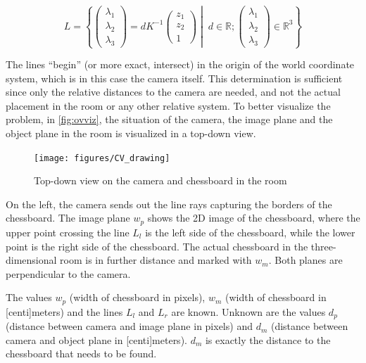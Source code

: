 \begin{equation} \label{eq:line}
    L = \left\{ \begin{pmatrix} \lambda_1 \\ \lambda_2 \\ \lambda_3 \end{pmatrix} = d K^{-1} \begin{pmatrix} z_1 \\ z_2 \\ 1 \end{pmatrix} \middle\vert \; d \in \mathbb{R}; \begin{pmatrix} \lambda_1 \\ \lambda_2 \\ \lambda_3 \end{pmatrix} \in \mathbb{R}^3 \right\}
\end{equation}

The lines \enquote{begin} (or more exact, intersect) in the origin of the world coordinate system, which is in this case the camera itself. This determination is sufficient since only the relative distances to the camera are needed, and not the actual placement in the room or any other relative system. To better visualize the problem, in \autoref{fig:ovviz}, the situation of the camera, the image plane and the object plane in the room is visualized in a top-down view.

\begin{figure}[h]
    \centering
    \texttt{[image: figures/CV\_drawing]}
    \caption{Top-down view on the camera and chessboard in the room}
    \label{fig:ovviz}
\end{figure}

On the left, the camera sends out the line rays capturing the borders of the chessboard. The image plane $w_p$ shows the 2D image of the chessboard, where the upper point crossing the line $L_l$ is the left side of the chessboard, while the lower point is the right side of the chessboard. The actual chessboard in the three-dimensional room is in further distance and marked with $w_m$. Both planes are perpendicular to the camera.

The values $w_p$ (width of chessboard in pixels), $w_m$ (width of chessboard in [centi]meters) and the lines $L_l$ and $L_r$ are known. Unknown are the values $d_p$ (distance between camera and image plane in pixels) and $d_m$ (distance between camera and object plane in [centi]meters). $d_m$ is exactly the distance to the chessboard that needs to be found.

